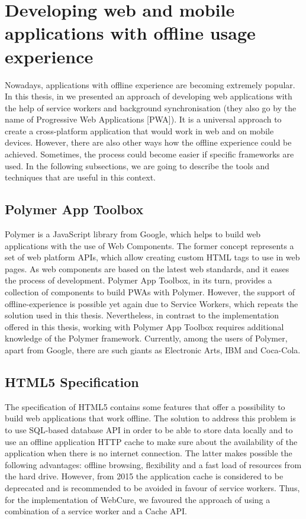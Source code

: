 \section{Developing web and mobile applications with offline usage experience}

Nowadays, applications with offline experience are becoming extremely popular. In this thesis, in  we presented an approach of developing web applications with the help of service workers and background synchronisation (they also go by the name of Progressive Web Applications [PWA]). It is a universal approach to create a cross-platform application that would work in web and on mobile devices. However, there are also other ways how the offline experience could be achieved. Sometimes, the process could become easier if specific frameworks are used. In the following subsections, we are going to describe the tools and techniques that are useful in this context. 


\subsection*{Polymer App Toolbox}

Polymer is a JavaScript library from Google, which helps to build web applications with the use of Web Components. The former concept represents a set of web platform APIs, which allow creating custom HTML tags to use in web pages\cite{16}. As web components are based on the latest web standards, and it eases the process of development. Polymer App Toolbox, in its turn, provides a collection of components to build PWAs with Polymer. However, the support of offline-experience is possible yet again due to Service Workers\cite{18}, which repeats the solution used in this thesis. Nevertheless, in contrast to the implementation offered in this thesis, working with Polymer App Toolbox requires additional knowledge of the Polymer framework. Currently, among the users of Polymer, apart from Google, there are such giants as Electronic Arts, IBM and Coca-Cola\cite{17}.

\subsection*{HTML5 Specification}

The specification of HTML5 contains some features that offer a possibility to build web applications that work offline. The solution to address this problem is to use SQL-based database API in order to be able to store data locally and to use an offline application HTTP cache to make sure about the availability of the application when there is no internet connection. The latter makes possible the following advantages: offline browsing, flexibility and a fast load of resources from the hard drive\cite{20}. However, from 2015 the application cache is considered to be deprecated and is recommended to be avoided\cite{21} in favour of service workers. Thus, for the implementation of WebCure, we favoured the approach of using a combination of a service worker and a Cache API.
 

